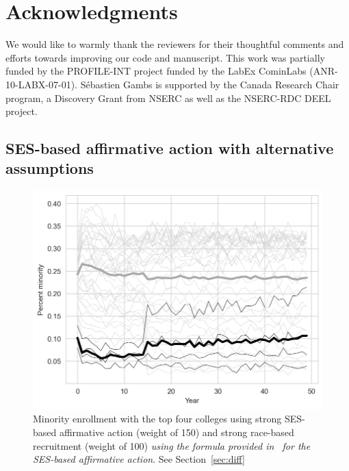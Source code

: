 \section*{Acknowledgments}

We would like to warmly thank the reviewers for their thoughtful comments and efforts towards improving our code and manuscript.
This work was partially funded by the PROFILE-INT project funded by the LabEx CominLabs (ANR-10-LABX-07-01).
Sébastien Gambs is supported by the Canada Research Chair program, a Discovery Grant from NSERC as well as the NSERC-RDC DEEL project.

\clearpage

\begin{appendices}

\section{SES-based affirmative action with alternative assumptions}

\begin{figure}[H]
  \centering
  \includegraphics[width=.79\textwidth]{figures/figC4_f1.png}
  \caption{Minority enrollment with the top four colleges using strong SES-based affirmative action (weight of 150) and strong race-based recruitment (weight of 100) \emph{using the formula provided in~\cite{reardon2018levels} for the SES-based affirmative action}. See Section~\ref{sec:diff}}
  \label{fig:c4_f1}
\end{figure}


\end{appendices}
